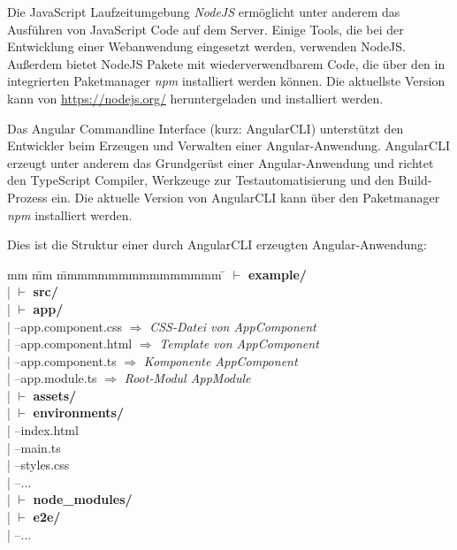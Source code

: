 \label{NodeJS}
Die JavaScript Laufzeitumgebung \textit{NodeJS} ermöglicht unter anderem das Ausführen von JavaScript Code auf dem Server. Einige Tools, die bei der Entwicklung einer Webanwendung eingesetzt werden, verwenden NodeJS. Außerdem bietet NodeJS Pakete mit wiederverwendbarem Code, die über den in integrierten Paketmanager \textit{npm} installiert werden können. Die aktuellste Version kann von \url{https://nodejs.org/} heruntergeladen und installiert werden.  \autocites[vgl.][1\psqq]{Steyer.2017}[vgl.][7\psqq]{Freeman.2018}[vgl.][6\psqq]{Woiwode.2018} 

Das Angular Commandline Interface (kurz: AngularCLI) unterstützt den Entwickler beim Erzeugen und Verwalten einer Angular-Anwendung. AngularCLI erzeugt unter anderem  das Grundgerüst einer Angular-Anwendung und richtet den TypeScript Compiler, Werkzeuge zur Testautomatisierung und den Build-Prozess ein. Die aktuelle Version von AngularCLI kann über den Paketmanager \textit{npm} installiert werden. \autocites[vgl.][1\psqq]{Steyer.2017}[vgl.][7\psqq]{Freeman.2018}[vgl.][6\psqq]{Woiwode.2018} 


Dies ist die Struktur einer durch AngularCLI erzeugten Angular-Anwendung:

\begin{tabbing}
	mm \= mm \= mmmmmmmmmmmmmmmm \= \kill
	$\vdash$ \textbf{example/} \\ 
	| \> $\vdash$ \textbf{src/}\\ 
	| \> \> $\vdash$  \textbf{app/}\\
	| \> \>  --app.component.css  $\Rightarrow$ \textit{CSS-Datei von AppComponent}\\ 
	| \> \>  --app.component.html  $\Rightarrow$ \textit{Template von AppComponent}\\
	| \> \>  --app.component.ts	 $\Rightarrow$ \textit{Komponente AppComponent}\\
	| \> \>  --app.module.ts  $\Rightarrow$ \textit{Root-Modul AppModule}\\
	| \> \> $\vdash$ \textbf{assets/} \\
	| \> \> $\vdash$ \textbf{environments/} \\
	| \> --index.html\\
	| \> --main.ts\\
	| \> --styles.css \\
	| \> --... \\
	| \> $\vdash$ \textbf{node\_modules/}\\ 
	| \> $\vdash$ \textbf{e2e/}\\   
	| --...\\
\end{tabbing}

